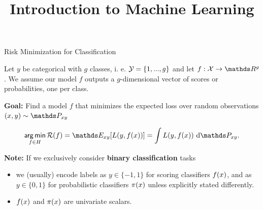 




\newcommand{\titlefigure}{figure_man/optimization_steps.jpeg}
\newcommand{\learninggoals}{
\item Know the 0-1-loss
\item Derive the point-wise optimum for the 0-1-loss 
\item Understand the concept of the Bayes Optimal Classifier and the Bayes Error 
}

\title{Introduction to Machine Learning}
\date{}






\begin{vbframe}{Risk Minimization for Classification}

Let $y$ be categorical with $g$ classes, i. e.  $\mathcal{Y} = \{1, ..., g\}$ and let $f: \Xspace \to \R^g$. We assume our model $f$ outputs a $g$-dimensional vector of scores or probabilities, one per class.

\lz

\textbf{Goal:} Find a model $f$ that minimizes the expected loss over random observations $\xy \sim \Pxy$ 

$$
\argmin_{f \in \Hspace} \riskf = \E_{xy}[\Lxy] = \int \Lxy ~ \text{d}\Pxy. 
$$

\textbf{Note:} If we exclusively consider \textbf{binary classification} tasks
\begin{itemize}
  \item we (usually) encode labels as $y \in \{-1, 1\}$ for scoring classifiers $f(x)$, and as $y \in \{0, 1\}$ for probabilistic classifiers $\pi(x)$ unless explicitly stated differently. 
  \item $f(x)$ and $\pi(x)$ are univariate scalars.
\end{itemize}

\end{vbframe}


